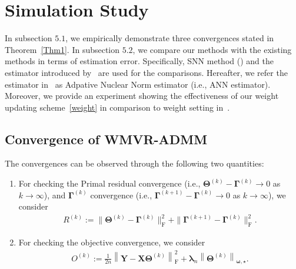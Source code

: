\documentclass[alpha-refs]{wiley-article}
\begin{document}
\section{Simulation Study} \label{SC5}
In subsection $5.1$, we empirically demonstrate three convergences stated in Theorem~\ref{Thm1}.
In subsection $5.2$, we compare our methods with the existing methods in terms of estimation error.
Specifically, SNN method (\citet{yuan2007dimension}) and the estimator introduced by~\citet{chen2013reduced} are used for the comparisons.
Hereafter, we refer the estimator in~\citet{chen2013reduced} as Adpative Nuclear Norm estimator (i.e., ANN estimator).
Moreover, we provide an experiment showing the effectiveness of our weight updating scheme~\eqref{weight} in comparison to weight setting in~\citet{chen2013reduced}.

\subsection{Convergence of WMVR-ADMM}
The convergences can be observed through the following two quantities:
\begin{enumerate}
    \item For checking the Primal residual convergence (i.e., $\boldsymbol{\Theta}^{(k)}-\boldsymbol{\Gamma}^{(k)}\rightarrow{0}$ as $k\rightarrow{\infty}$),
    and $\boldsymbol{\Gamma}^{(k)}$ convergence (i.e., $\boldsymbol{\Gamma}^{(k+1)}-\boldsymbol{\Gamma}^{(k)}\rightarrow{0}$ as $k\rightarrow{\infty}$), we consider
    \begin{align*}
        R^{(k)} := \| \boldsymbol{\Theta}^{(k)}-\boldsymbol{\Gamma}^{(k)} \|_{\text{F}}^{2} +
        \| \boldsymbol{\Gamma}^{(k+1)}-\boldsymbol{\Gamma}^{(k)} \|_{\text{F}}^{2}.
    \end{align*}
    \item For checking the objective convergence, we consider
    \begin{align*}
        O^{(k)} :=  \frac{1}{2n} \left\| \boldsymbol{Y}-\boldsymbol{X}\boldsymbol{\Theta}^{(k)} \right\|_{\text{F}}^{2} + \boldsymbol{\lambda}_{n} \left\| \boldsymbol{\Theta}^{(k)}\right\|_{\boldsymbol{\omega,\star}} .
    \end{align*}
\end{enumerate}
\end{document}
